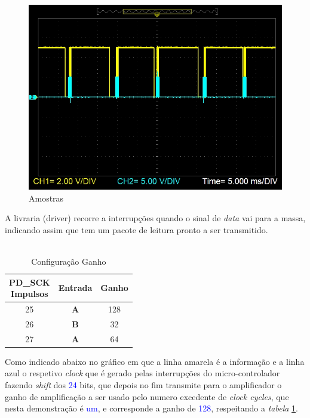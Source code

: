 \begin{figure}[H]
	\centering
	\includegraphics[scale=0.55]{./image/PESTA/graph/80SPS64GAIN/SPS_80.JPG}
	\caption{Amostras}
	\label{SPS_64}
\end{figure}
A livraria (driver) recorre a interrupções quando o sinal de \textit{data} vai para a massa, indicando assim que tem um pacote de leitura pronto a ser transmitido.\\
\\
\begin{minipage}[!b]{.40\linewidth}
	\begin{table}[H]
		\captionsetup{justification=raggedright,singlelinecheck=false}
		\begin{tabular}{ | c | c | c |  }
			\hline
			\makecell[c]{PD\_SCK \\ Impulsos} & Entrada  & Ganho \\
			\hline
			\hline
			25 & \textbf{A} & 128 \\
			\hline
			26 & \textbf{B} & 32 \\
			\hline
			27 & \textbf{A} & 64 \\
			\hline
		\end{tabular}	
		\caption{Configuração Ganho}
		\label{Gain_Selection}
	\end{table}
	\vfill
\end{minipage}
\begin{minipage}[l]{.6\linewidth}
\vspace{.3cm}
Como indicado abaixo no gráfico em que a linha amarela é a informação e a linha azul o respetivo \textit{clock} que é gerado pelas interrupções do micro-controlador fazendo \textit{shift} dos \textcolor{blue}{24} bits, que depois no fim transmite para o amplificador o ganho de amplificação a ser usado pelo numero excedente de \textit{clock cycles}, que nesta demonstração é \textcolor{blue}{um}, e corresponde a ganho de \textcolor{blue}{128}, respeitando a \textit{tabela} \ref{Gain_Selection}.
\end{minipage}\\
